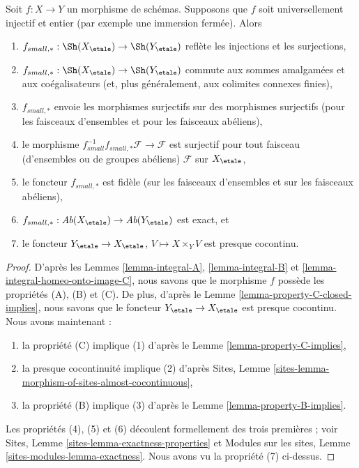 \begin{lemma}
\label{lemma-integral-universally-injective}
Soit $f : X \to Y$ un morphisme de sch\'emas. Supposons que $f$ soit
universellement injectif et entier (par exemple une immersion ferm\'ee).
Alors
\begin{enumerate}
\item
$f_{small, *} :
\Sh(X_\etale)
\to
\Sh(Y_\etale)$
refl\`ete les injections et les surjections,
\item
$f_{small, *} :
\Sh(X_\etale)
\to
\Sh(Y_\etale)$
commute aux sommes amalgam\'ees et aux co\'egalisateurs (et, plus g\'en\'eralement,
aux colimites connexes finies),
\item $f_{small, *}$ envoie les morphismes surjectifs sur des morphismes surjectifs (pour les faisceaux
d'ensembles et pour les faisceaux ab\'eliens),
\item le morphisme
$f_{small}^{-1}f_{small, *}\mathcal{F} \to \mathcal{F}$
est surjectif pour tout faisceau (d'ensembles ou de groupes ab\'eliens)
$\mathcal{F}$ sur $X_\etale$,
\item le foncteur $f_{small, *}$ est fid\`ele (sur les faisceaux d'ensembles et
sur les faisceaux ab\'eliens),
\item
$f_{small, *} :
\textit{Ab}(X_\etale)
\to
\textit{Ab}(Y_\etale)$
est exact, et
\item le foncteur
$Y_\etale \to X_\etale$, $V \mapsto X \times_Y V$ est
presque cocontinu.
\end{enumerate}
\end{lemma}

\begin{proof}
D'apr\`es les
Lemmes \ref{lemma-integral-A},
\ref{lemma-integral-B} et
\ref{lemma-integral-homeo-onto-image-C},
nous savons que le morphisme $f$ poss\`ede les propri\'et\'es (A), (B) et (C).
De plus, d'apr\`es le
Lemme \ref{lemma-property-C-closed-implies},
nous savons que le foncteur $Y_\etale \to X_\etale$ est
presque cocontinu. Nous avons maintenant :
\begin{enumerate}
\item la propri\'et\'e (C) implique (1) d'apr\`es le
Lemme \ref{lemma-property-C-implies},
\item la presque cocontinuit\'e implique (2) d'apr\`es
Sites, Lemme \ref{sites-lemma-morphism-of-sites-almost-cocontinuous},
\item la propri\'et\'e (B) implique (3) d'apr\`es le
Lemme \ref{lemma-property-B-implies}.
\end{enumerate}
Les propri\'et\'es (4), (5) et (6) d\'ecoulent formellement des trois premi\`eres ; voir
Sites, Lemme \ref{sites-lemma-exactness-properties}
et
Modules sur les sites, Lemme \ref{sites-modules-lemma-exactness}.
Nous avons vu la propri\'et\'e (7) ci-dessus.
\end{proof}




